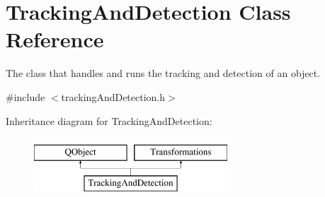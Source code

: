 \hypertarget{class_tracking_and_detection}{}\section{Tracking\+And\+Detection Class Reference}
\label{class_tracking_and_detection}


The class that handles and runs the tracking and detection of an object.  




{\ttfamily \#include $<$tracking\+And\+Detection.\+h$>$}

Inheritance diagram for Tracking\+And\+Detection\+:\begin{figure}[H]
\begin{center}
\leavevmode
\includegraphics[height=2.000000cm]{class_tracking_and_detection}
\end{center}
\end{figure}
